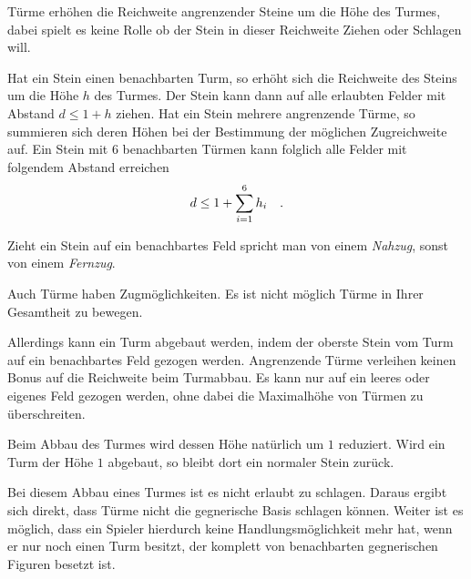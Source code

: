 \bigskip

Türme erhöhen die Reichweite angrenzender Steine um die Höhe des Turmes, dabei spielt es keine Rolle ob der Stein in dieser Reichweite Ziehen oder Schlagen will.

Hat ein Stein einen benachbarten Turm, so erhöht sich die Reichweite des Steins um die Höhe $h$ des Turmes. Der Stein kann dann auf alle erlaubten Felder mit Abstand $d \le 1 + h$ ziehen. Hat ein Stein mehrere angrenzende Türme, so summieren sich deren Höhen bei der Bestimmung der möglichen Zugreichweite auf. Ein Stein mit $6$ benachbarten Türmen kann folglich alle Felder mit folgendem Abstand erreichen \[d \le 1 + \sum_{i=1}^6 h_i\hspace*{10pt}.\]

Zieht ein Stein auf ein benachbartes Feld spricht man von einem \emph{Nahzug}, sonst von einem \emph{Fernzug}.

\newpage
{}

\bigskip

Auch Türme haben Zugmöglichkeiten. Es ist nicht möglich Türme in Ihrer Gesamtheit zu bewegen. 

Allerdings kann ein Turm abgebaut werden, indem der oberste Stein vom Turm auf ein benachbartes Feld gezogen werden. Angrenzende Türme verleihen keinen Bonus auf die Reichweite beim Turmabbau. Es kann nur auf ein leeres oder eigenes Feld gezogen werden, ohne dabei die Maximalhöhe von Türmen zu überschreiten.

Beim Abbau des Turmes wird dessen Höhe natürlich um $1$ reduziert. Wird ein Turm der Höhe $1$ abgebaut, so bleibt dort ein normaler Stein zurück.

Bei diesem Abbau eines Turmes ist es nicht erlaubt zu schlagen. Daraus ergibt sich direkt, dass Türme nicht die gegnerische Basis schlagen können. Weiter ist es möglich, dass ein Spieler hierdurch keine Handlungsmöglichkeit mehr hat, wenn er nur noch einen Turm besitzt, der komplett von benachbarten gegnerischen Figuren besetzt ist. 



